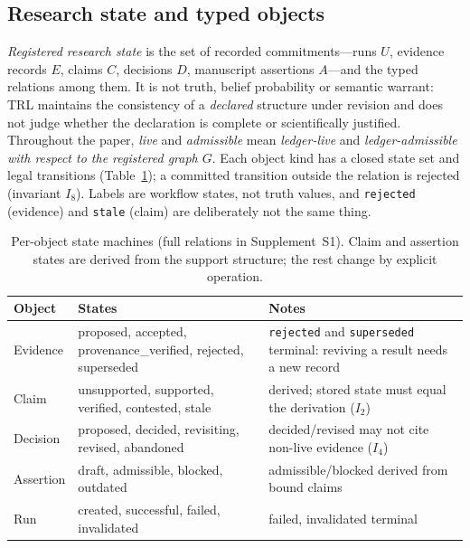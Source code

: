 \documentclass[journal]{IEEEtran}
\newcommand{\suppl}[1]{Supplement~#1}
\begin{document}
\subsection{Research state and typed objects}
\label{sec:states}
\emph{Registered research state} is the set of recorded commitments---runs $U$, evidence records $E$, claims $C$, decisions $D$, manuscript assertions $A$---and the typed relations among them. It is not truth, belief probability or semantic warrant: TRL maintains the consistency of a \emph{declared} structure under revision and does not judge whether the declaration is complete or scientifically justified. Throughout the paper, \emph{live} and \emph{admissible} mean \emph{ledger-live} and \emph{ledger-admissible with respect to the registered graph $G$}. Each object kind has a closed state set and legal transitions (Table~\ref{tab:states}); a committed transition outside the relation is rejected (invariant $I_8$). Labels are workflow states, not truth values, and \texttt{rejected} (evidence) and \texttt{stale} (claim) are deliberately not the same thing.

\begin{table}[t]
\centering
\caption{Per-object state machines (full relations in \suppl{S1}). Claim and assertion states are derived from the support structure; the rest change by explicit operation.}
\label{tab:states}
\scriptsize
\begin{tabularx}{\columnwidth}{l>{\raggedright\arraybackslash}X>{\raggedright\arraybackslash}X}
\toprule
Object & States & Notes \\
\midrule
Evidence & proposed, accepted, provenance\_verified, rejected, superseded & \texttt{rejected} and \texttt{superseded} terminal: reviving a result needs a new record \\
Claim & unsupported, supported, verified, contested, stale & derived; stored state must equal the derivation ($I_2$) \\
Decision & proposed, decided, revisiting, revised, abandoned & decided/revised may not cite non-live evidence ($I_4$) \\
Assertion & draft, admissible, blocked, outdated & admissible/blocked derived from bound claims \\
Run & created, successful, failed, invalidated & failed, invalidated terminal \\
\bottomrule
\end{tabularx}
\end{table}
\end{document}
